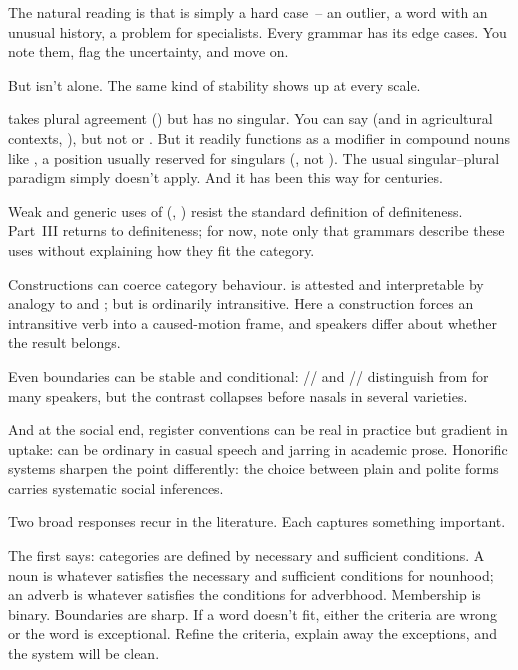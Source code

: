 The natural reading is that  is simply a hard case~-- an outlier, a word with an unusual history, a problem for specialists. Every grammar has its edge cases. You note them, flag the uncertainty, and move on.

But  isn't alone. The same kind of stability shows up at every scale.

 takes plural agreement () but has no singular. You can say  (and in agricultural contexts, ), but not  or . But it readily functions as a modifier in compound nouns like , a position usually reserved for singulars (, not ). The usual singular--plural paradigm simply doesn't apply. And it has been this way for centuries.

Weak and generic uses of  (, ) resist the standard definition of definiteness. Part~III returns to definiteness; for now, note only that grammars describe these uses without explaining how they fit the category.

Constructions can coerce category behaviour.  is attested and interpretable by analogy to  and ; but  is ordinarily intransitive. Here a construction forces an intransitive verb into a caused-motion frame, and speakers differ about whether the result belongs.

Even  boundaries can be stable and conditional: // and // distinguish  from  for many speakers, but the contrast collapses before nasals in several varieties.

And at the social end, register conventions can be real in practice but gradient in uptake:  can be ordinary in casual speech and jarring in academic prose. Honorific systems sharpen the point differently: the choice between plain and polite forms carries systematic social inferences.

Two broad responses recur in the literature. Each captures something important.

The first says: categories are defined by necessary and sufficient conditions. A noun is whatever satisfies the necessary and sufficient conditions for nounhood; an adverb is whatever satisfies the conditions for adverbhood. Membership is binary. Boundaries are sharp. If a word doesn't fit, either the criteria are wrong or the word is exceptional. Refine the criteria, explain away the exceptions, and the system will be clean.

